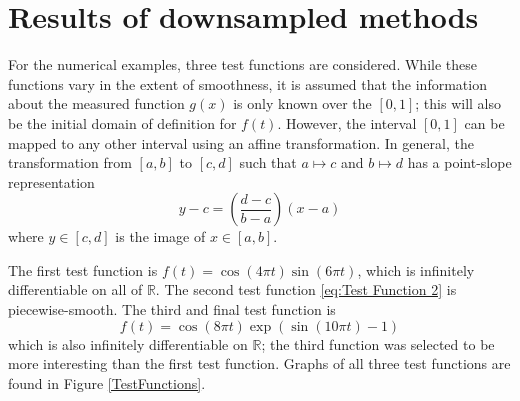 
\section{Results of downsampled methods} \label{sec:Downsampled Results}

For the numerical examples, three test functions are considered. While these functions vary in the extent of smoothness, it is assumed that the information about the measured function $g(x)$ is only known over the $[0,1]$; this will also be the initial domain of definition for $f(t)$. However, the interval $[0,1]$ can be mapped to any other interval using an affine transformation. In general, the transformation from $[a,b]$ to $[c,d]$ such that $a \mapsto c$ and $b \mapsto d$ has a point-slope representation
\[y - c = \left(\frac{d-c}{b-a}\right)(x - a)\]
where $y \in [c,d]$ is the image of $x \in [a,b]$. \par
The first test function is $f(t) = \cos(4\pi{t})\sin(6\pi{t})$, which is infinitely differentiable on all of $\mathbb{R}$. The second test function \eqref{eq:Test Function 2} is piecewise-smooth. The third and final test function is
\begin{equation}
f(t) = \cos(8\pi{t})\exp(\sin(10\pi{t})-1)
\label{eq:Test Function 3}
\end{equation}
which is also infinitely differentiable on $\mathbb{R}$; the third function was selected to be more interesting than the first test function. Graphs of all three test functions are found in Figure \ref{TestFunctions}.  \par

